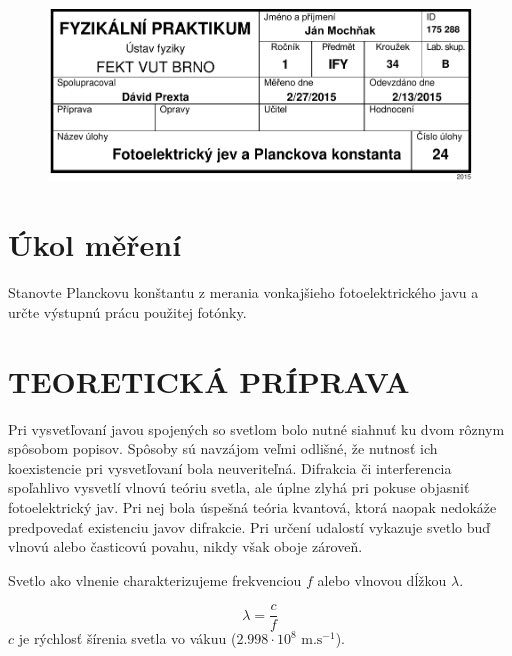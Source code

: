 \documentclass[12pt,a4paper,final]{report}
\begin{document}
\begin{figure}[h!]
	\centering
	\includegraphics[scale=1,clip=true]{IFY24-crop.pdf}
\end{figure}

\section*{Úkol měření}
Stanovte Planckovu konštantu z merania vonkajšieho fotoelektrického javu a určte výstupnú prácu použitej fotónky.

\section*{TEORETICKÁ PRÍPRAVA}
Pri vysvetľovaní javou spojených so svetlom bolo nutné siahnuť ku dvom rôznym spôsobom popisov. Spôsoby sú navzájom veľmi odlišné, že nutnosť ich koexistencie pri vysvetľovaní bola neuveriteľná. Difrakcia či interferencia spoľahlivo vysvetlí vlnovú teóriu svetla, ale úplne zlyhá pri pokuse objasniť fotoelektrický jav. Pri nej bola úspešná teória kvantová, ktorá naopak nedokáže predpovedať existenciu javov difrakcie. Pri určení udalostí vykazuje svetlo buď vlnovú alebo časticovú povahu, nikdy však oboje zároveň.

Svetlo ako vlnenie charakterizujeme frekvenciou $f$ alebo vlnovou dĺžkou $\lambda$. 

\begin{equation} \label{eq:vlnenie}
	\lambda = \frac{c}{f}
\end{equation} $c$ je rýchlosť šírenia svetla vo vákuu ($2.998\cdot10^8\text{ m.s}^{-1}$).
\end{document}
